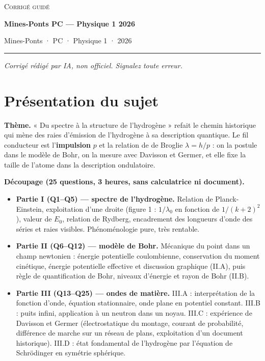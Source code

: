 \documentclass[11pt,a4paper]{article}
\providecommand{\tightlist}{\setlength{\itemsep}{0pt}\setlength{\parskip}{0pt}}
\begin{document}
\thispagestyle{plain}
\begin{center}
  {\small\scshape Corrigé guidé}\par\smallskip
  {\LARGE\bfseries Mines-Ponts PC — Physique 1 2026\par}\medskip
  {\large Mines-Ponts · PC · Physique 1 · 2026\par}
\end{center}
\vspace{2pt}\hrule\vspace{8pt}

\emph{Corrigé rédigé par IA, non officiel. Signalez toute erreur.}

\hypertarget{pruxe9sentation-du-sujet}{%
\section{Présentation du sujet}\label{pruxe9sentation-du-sujet}}

\textbf{Thème.} « Du spectre à la structure de l'hydrogène » refait le chemin historique qui mène des raies d'émission de l'hydrogène à sa description quantique. Le fil conducteur est l'\textbf{impulsion} \(p\) et la relation de de Broglie \(\lambda=h/p\) : on la postule dans le modèle de Bohr, on la mesure avec Davisson et Germer, et elle fixe la taille de l'atome dans la description ondulatoire.

\textbf{Découpage (25 questions, 3 heures, sans calculatrice ni document).}

\begin{itemize}
\tightlist
\item
  \textbf{Partie I (Q1--Q5) --- spectre de l'hydrogène.} Relation de Planck-Einstein, exploitation d'une droite (figure 1 : \(1/\lambda_0\) en fonction de \(1/(k+2)^2\)), valeur de \(E_0\), relation de Rydberg, encadrement des longueurs d'onde des séries et raies visibles. Phénoménologie pure, très rentable.
\item
  \textbf{Partie II (Q6--Q12) --- modèle de Bohr.} Mécanique du point dans un champ newtonien : énergie potentielle coulombienne, conservation du moment cinétique, énergie potentielle effective et discussion graphique (II.A), puis règle de quantification de Bohr, niveaux d'énergie et rayon de Bohr (II.B).
\item
  \textbf{Partie III (Q13--Q25) --- ondes de matière.} III.A : interprétation de la fonction d'onde, équation stationnaire, onde plane en potentiel constant. III.B : puits infini, application à un neutron dans un noyau. III.C : expérience de Davisson et Germer (électrostatique du montage, courant de probabilité, différence de marche sur un réseau de plans, exploitation d'un document historique). III.D : état fondamental de l'hydrogène par l'équation de Schrödinger en symétrie sphérique.
\end{itemize}
\end{document}
